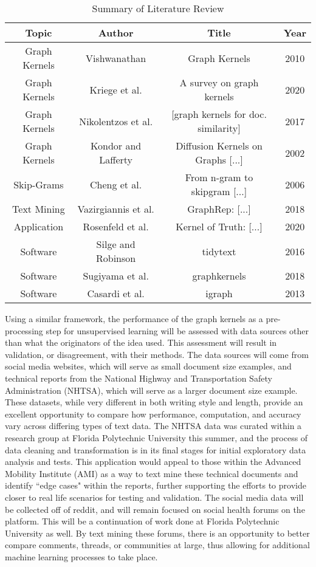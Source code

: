 \begin{table}[H]
\caption{Summary of Literature Review}
\centering
\begin{tabular}{ c c c c}
\hline
\hline
Topic & Author & Title & Year \\ [0.5ex]
\hline
Graph Kernels & Vishwanathan & Graph Kernels & 2010\\
Graph Kernels & Kriege et al. & A survey on graph kernels & 2020\\
Graph Kernels & Nikolentzos et al. & [graph kernels for doc. similarity] & 2017\\
Graph Kernels & Kondor and Lafferty &  Diffusion Kernels on Graphs [...] & 2002\\
Skip-Grams & Cheng et al. & From n-gram to skipgram [...] & 2006\\
Text Mining & Vazirgiannis et al. & GraphRep: [...] & 2018 \\
Application & Rosenfeld et al. & Kernel of Truth: [...] & 2020\\
Software & Silge and Robinson& tidytext &  2016\\
Software & Sugiyama et al. & graphkernels & 2018 \\
Software & Casardi et al. & igraph & 2013\\


\hline
\end{tabular}

\end{table}



Using a similar framework, the performance of the graph kernels as a pre-processing step for unsupervised learning will be assessed with data sources other than what the originators of the idea used. This assessment will result in validation, or disagreement, with their methods. The data sources will come from social media websites, which will serve as small document size examples, and technical reports from the National Highway and Transportation Safety Administration (NHTSA), which will serve as a larger document size example. These datasets, while very different in both writing style and length, provide an excellent opportunity to compare how performance, computation, and accuracy vary across differing types of text data. The NHTSA data was curated within a research group at Florida Polytechnic University this summer, and the process of data cleaning and transformation is in its final stages for initial exploratory data analysis and tests. This application would appeal to those within the Advanced Mobility Institute (AMI) as a way to text mine these technical documents and identify ``edge cases" within the reports, further supporting the efforts to provide closer to real life scenarios for testing and validation. The social media data will be collected off of reddit, and will remain focused on social health forums on the platform. This will be a continuation of work done at Florida Polytechnic University as well. By text mining these forums, there is an opportunity to better compare comments, threads, or communities at large, thus allowing for additional machine learning processes to take place. 


